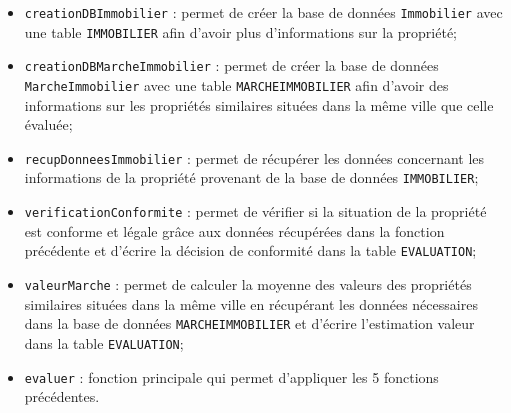 \documentclass{article}
\begin{document}
            \begin{itemize}
            \item \texttt{creationDBImmobilier} : permet de créer la base de données \texttt{Immobilier} avec une table \texttt{IMMOBILIER} afin d'avoir plus d'informations sur la propriété;
            \item \texttt{creationDBMarcheImmobilier} : permet de créer la base de données \texttt{MarcheImmobilier} avec une table \texttt{MARCHEIMMOBILIER} afin d'avoir des informations sur les propriétés similaires situées dans la même ville que celle évaluée;
            \item \texttt{recupDonneesImmobilier} : permet de récupérer les données concernant les informations de la propriété provenant de la base de données \texttt{IMMOBILIER}; 
            \item \texttt{verificationConformite} : permet de vérifier si la situation de la propriété est conforme et légale grâce aux données récupérées dans la fonction précédente et d'écrire la décision de conformité dans la table \texttt{EVALUATION};
            \item \texttt{valeurMarche} : permet de calculer la moyenne des valeurs des propriétés similaires situées dans la même ville en récupérant les données nécessaires dans la base de données \texttt{MARCHEIMMOBILIER} et d'écrire l'estimation valeur dans la table \texttt{EVALUATION};
            \item \texttt{evaluer} : fonction principale qui permet d'appliquer les 5 fonctions précédentes.
            \end{itemize}
            
\end{document}
